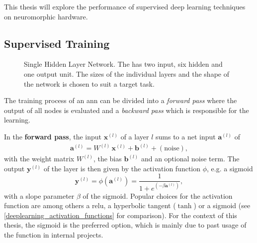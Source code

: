 This thesis will explore the performance of supervised deep learning techniques on neuromorphic hardware.



\subsection{Supervised Training}
\label{supervisedtraining}
\begin{figure}
	\centering
	
	\caption[Single Hidden Layer Network]{Single Hidden Layer Network. The has two input, six hidden and one output unit. The sizes of the individual layers and the shape of the network is chosen to suit a target task.} 
	\label{hxcloseup}
\end{figure}
The training process of an \gls{ann} can be divided into a \emph{forward pass} where the output of all nodes is evaluated and a \emph{backward pass} which is responsible for the learning.

In the \textbf{forward pass}, the input $\mathbf{x}^{(l)}$ of a layer $l$ sums to a net input $\mathbf{a}^{(l)}$ of
\begin{align*}
\mathbf{a}^{(l)} = W^{(l)} \, \mathbf{x}^{(l)} + \mathbf{b}^{(l)} + \left(\text{noise}\right), 
\end{align*}
with the weight matrix $W^{(l)}$, the bias $\mathbf{b}^{(l)}$ and an optional noise term. The output $\mathbf{y}^{(l)}$ of the layer is then given by the activation function $\phi$, e.g. a sigmoid
\begin{equation*}
\mathbf{y}^{(l)} = \phi(\mathbf{a}^{(l)}) = \frac{1}{1 + e^{(-\beta \mathbf{a}^{(l)})}},
\end{equation*}
with a slope parameter $\beta$ of the sigmoid. Popular choices for the activation function are among others a \gls{relu}, a hyperbolic tangent ($\tanh$) or a sigmoid (see \cref{deeplearning_activation_functions} for comparison). For the context of this thesis, the sigmoid is the preferred option, which is mainly due to past usage of the function in internal projects.

